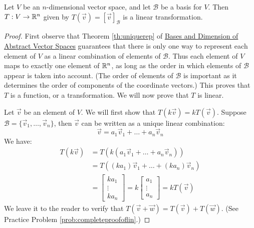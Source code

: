 \documentclass{ximera}
\begin{document}
\begin{theorem}\label{th:coordvectmappinglinear}
Let $V$ be an $n$-dimensional vector space, and let $\mathcal{B}$ be a basis for $V$.  Then  $T:V\rightarrow \mathbb{R}^n$ given by $T(\vec{v})=[\vec{v}]_{\mathcal{B}}$ is a linear transformation.
\end{theorem}
\begin{proof}
First observe that Theorem \ref{th:uniquerep} of \href{https://ximera.osu.edu/oerlinalg/LinearAlgebra/VSP-0060/main}{Bases and Dimension of Abstract Vector Spaces} guarantees that there is only one way to represent each element of $V$ as a linear combination of elements of $\mathcal{B}$.  Thus each element of $V$ maps to exactly one element of $\mathbb{R}^n$, as long as the order in which elements of $\mathcal{B}$ appear is taken into account.  (The order of elements of $\mathcal{B}$ is important as it determines the order of components of the coordinate vectors.)  This proves that $T$ is a function, or a transformation.  We will now prove that $T$ is linear.

Let $\vec{v}$ be an element of $V$.  We will first show that $T(k\vec{v})=kT(\vec{v})$.  Suppose $\mathcal{B}=\{\vec{v}_1, \ldots ,\vec{v}_n\}$, then $\vec{v}$ can be written as a unique linear combination:
$$\vec{v}=a_1\vec{v}_1+ \ldots +a_n\vec{v}_n$$
We have:
\begin{align*}
    T(k\vec{v})&=T(k(a_1\vec{v}_1+ \ldots +a_n\vec{v}_n))\\
    &=T((ka_1)\vec{v}_1+ \ldots +(ka_n)\vec{v}_n)\\
    &=\begin{bmatrix}ka_1\\\vdots\\ka_n\end{bmatrix}=k\begin{bmatrix}a_1\\\vdots\\a_n\end{bmatrix}=kT(\vec{v})
\end{align*}
We leave it to the reader to verify that $T(\vec{v}+\vec{w})=T(\vec{v})+T(\vec{w})$.  (See Practice Problem \ref{prob:completeproofoflin}.)
\end{proof}

\end{document}
